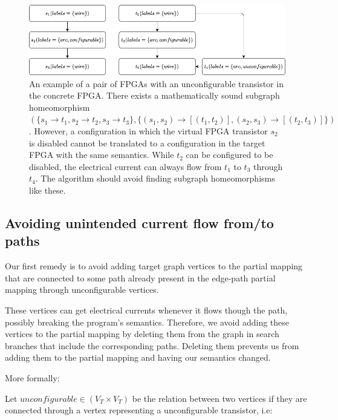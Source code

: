 \begin{figure}

  \centering
\includegraphics[scale=0.6]{images/contraction/unconfigurableExample.png}

\caption{An example of a pair of FPGAs with an unconfigurable transistor in the concrete FPGA. There exists a mathematically sound subgraph homeomorphism $(\{s_1 \to t_1, s_2 \to t_2, s_3 \to t_3\}, \{(s_1, s_2) \to [(t_1, t_2)], (s_2, s_3) \to [(t_2, t_3)]\})$. However, a configuration in which the virtual FPGA transistor $s_2$ is disabled cannot be translated to a configuration in the target FPGA with the same semantics. While $t_2$ can be configured to be disabled, the electrical current can always flow from $t_1$ to $t_3$ through $t_4$. The algorithm should avoid finding subgraph homeomorphisms like these.}

\label{fig:unconfigurableExample}
\end{figure}

\subsection{Avoiding unintended current flow from/to paths}
\label{sec:unintendedcurrent-path}
Our first remedy is to avoid adding target graph vertices to the partial mapping that are connected to some path already present in the edge-path partial mapping through unconfigurable vertices. 

These vertices can get electrical currents whenever it flows though the path, possibly breaking the program's semantics. Therefore, we avoid adding these vertices to the partial mapping by deleting them from the graph in search branches that include the corresponding paths. Deleting them prevents us from adding them to the partial mapping and having our semantics changed. 

More formally:

Let $\mathit{unconfigurable}\in (V_T \times V_T)$ be the relation between two vertices if they are connected through a vertex representing a unconfigurable transistor, i.e:

\vspace{10pt}

